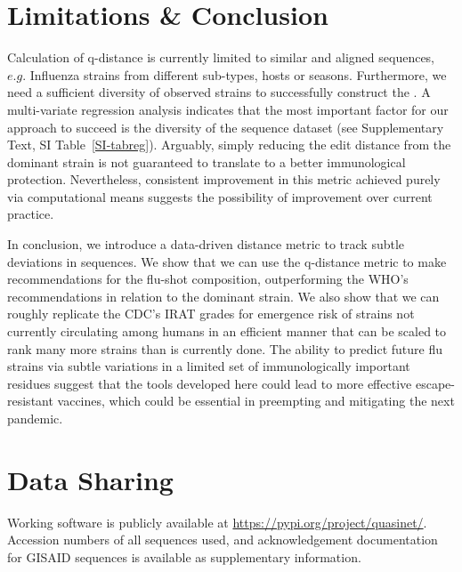 \documentclass[onecolumn, compsoc,10pt]{IEEEtran}
\begin{document}
\section*{Limitations \& Conclusion}

Calculation of q-distance  is currently limited to similar and aligned sequences, $e.g.$  Influenza strains from different sub-types, hosts or seasons. Furthermore, we need a sufficient diversity of observed strains to successfully construct the \qnet. A multi-variate regression analysis indicates  that the most important factor for our approach to succeed is  the diversity of the sequence dataset (see Supplementary Text, SI Table~\ref{SI-tabreg}). Arguably, simply reducing the edit distance from the dominant strain is not guaranteed to translate to a better immunological protection. Nevertheless, consistent improvement in this metric achieved purely via computational means suggests the possibility of improvement over current practice. 

In conclusion, we introduce a data-driven distance metric to track subtle deviations in sequences. We show that we can use the q-distance metric to make recommendations for the flu-shot composition, outperforming the WHO's recommendations in relation to the dominant strain. We also show that we can roughly replicate the CDC's IRAT grades for emergence risk of strains not currently circulating among humans in an efficient manner that can be scaled to rank many more strains than is currently done. The ability to predict future flu strains via subtle variations in a limited set of immunologically important residues suggest that the tools developed here could lead to more effective escape-resistant vaccines, which could be essential in preempting and mitigating the next pandemic.











\section*{Data Sharing} 

Working software is publicly available at \href{https://pypi.org/project/quasinet/}{https://pypi.org/project/quasinet/}.
Accession numbers of all sequences used, and acknowledgement documentation for GISAID sequences is available as supplementary information.
\end{document}
